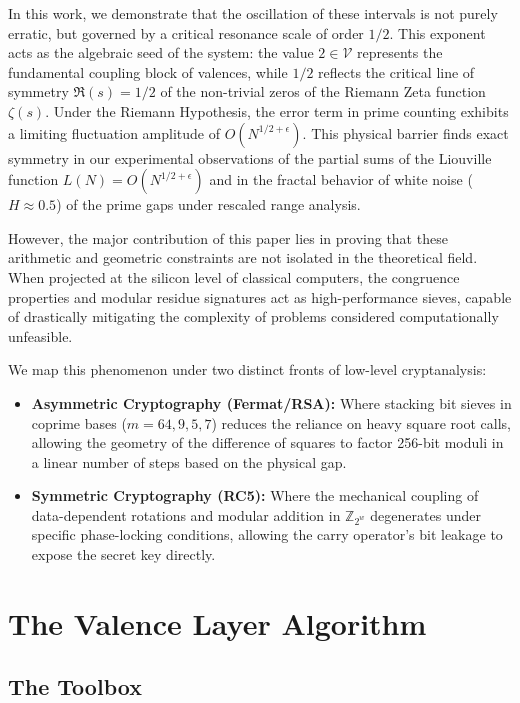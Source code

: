 \documentclass[12pt,a4paper]{article}
\theoremstyle{plain}
\begin{document}
In this work, we demonstrate that the oscillation of these intervals is not purely erratic, but governed by a critical resonance scale of order $1/2$. This exponent acts as the algebraic seed of the system: the value $2 \in \mathcal{V}$ represents the fundamental coupling block of valences, while $1/2$ reflects the critical line of symmetry $\Re(s) = 1/2$ of the non-trivial zeros of the Riemann Zeta function $\zeta(s)$. Under the Riemann Hypothesis, the error term in prime counting exhibits a limiting fluctuation amplitude of $O(N^{1/2+\epsilon})$. This physical barrier finds exact symmetry in our experimental observations of the partial sums of the Liouville function $L(N) = O(N^{1/2+\epsilon})$ and in the fractal behavior of white noise ($H \approx 0.5$) of the prime gaps under rescaled range analysis.

However, the major contribution of this paper lies in proving that these arithmetic and geometric constraints are not isolated in the theoretical field. When projected at the silicon level of classical computers, the congruence properties and modular residue signatures act as high-performance sieves, capable of drastically mitigating the complexity of problems considered computationally unfeasible.

We map this phenomenon under two distinct fronts of low-level cryptanalysis:
\begin{itemize}
  \item \textbf{Asymmetric Cryptography (Fermat/RSA):} Where stacking bit sieves in coprime bases ($m = 64, 9, 5, 7$) reduces the reliance on heavy square root calls, allowing the geometry of the difference of squares to factor 256-bit moduli in a linear number of steps based on the physical gap.
  \item \textbf{Symmetric Cryptography (RC5):} Where the mechanical coupling of data-dependent rotations and modular addition in $\mathbb{Z}_{2^w}$ degenerates under specific phase-locking conditions, allowing the carry operator's bit leakage to expose the secret key directly.
\end{itemize}

\section{The Valence Layer Algorithm}
\label{sec:alg}

\subsection{The Toolbox}
\label{sec:tools}
\end{document}
